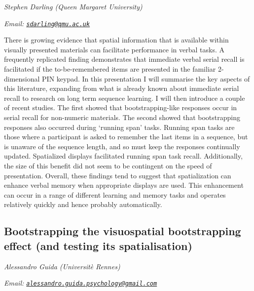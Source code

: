 \documentclass[12pt,]{book}
\begin{document}
\emph{Stephen Darling (Queen Margaret University)}

\emph{Email: \href{mailto:sdarling@qmu.ac.uk}{\nolinkurl{sdarling@qmu.ac.uk}}}

There is growing evidence that spatial information that is available within visually presented materials can facilitate performance in verbal tasks. A frequently replicated finding demonstrates that immediate verbal serial recall is facilitated if the to-be-remembered items are presented in the familiar 2-dimensional PIN keypad. In this presentation I will summarise the key aspects of this literature, expanding from what is already known about immediate serial recall to research on long term sequence learning. I will then introduce a couple of recent studies. The first showed that bootstrapping-like responses occur in serial recall for non-numeric materials. The second showed that bootstrapping responses also occurred during `running span' tasks. Running span tasks are those where a participant is asked to remember the last items in a sequence, but is unaware of the sequence length, and so must keep the responses continually updated. Spatialized displays facilitated running span task recall. Additionally, the size of this benefit did not seem to be contingent on the speed of presentation. Overall, these findings tend to suggest that spatialization can enhance verbal memory when appropriate displays are used. This enhancement can occur in a range of different learning and memory tasks and operates relatively quickly and hence probably automatically.

\hypertarget{bootstrapping-the-visuospatial-bootstrapping-effect-and-testing-its-spatialisation}{%
\subsection{Bootstrapping the visuospatial bootstrapping effect (and testing its spatialisation)}\label{bootstrapping-the-visuospatial-bootstrapping-effect-and-testing-its-spatialisation}}

\emph{Alessandro Guida (Universitè Rennes)}

\emph{Email: \href{mailto:alessandro.guida.psychology@gmail.com}{\nolinkurl{alessandro.guida.psychology@gmail.com}}}
\end{document}
